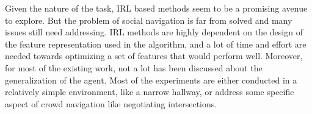 Given the nature of the task, IRL based methods seem to be a promising avenue to explore. But the problem of social navigation is far from solved and many issues still need addressing. IRL methods are highly dependent on the design of the feature representation used in the algorithm, and a lot of time and effort are needed towards optimizing a set of features that would perform well. Moreover, for most of the existing work, not a lot has been discussed about the generalization of the agent. Most of the experiments are either conducted in a relatively simple environment, like a narrow hallway, or address some specific aspect of crowd navigation like negotiating intersections. 

